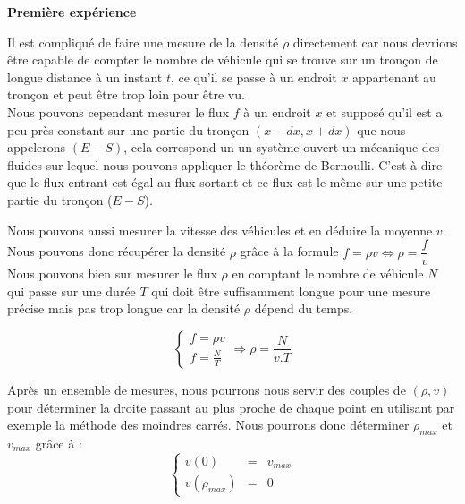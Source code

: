 \documentclass[12pt, openany]{report}
\begin{document}
\centering \textbf{\Large Première expérience}

\flushleft
Il est compliqué de faire une mesure de la densité $\rho$ directement car nous devrions être capable de compter le nombre de véhicule qui se trouve sur un tronçon de longue distance à un instant $t$, ce qu'il se passe à un endroit $x$ appartenant au tronçon et peut être trop loin pour être vu.\\
Nous pouvons cependant mesurer le flux $f$ à un endroit $x$ et supposé qu'il est a peu près constant sur une partie du tronçon $(x-dx,x+dx)$ que nous appelerons $(E-S)$, cela correspond un un système ouvert un mécanique des fluides sur lequel nous pouvons appliquer le théorème de Bernoulli. C'est à dire que le flux entrant est égal au flux sortant et ce flux est le même sur une petite partie du tronçon ($E-S$).\\

\centering{}
\flushleft

Nous pouvons aussi mesurer la vitesse des véhicules et en déduire la moyenne $v$.\\
Nous pouvons donc récupérer la densité $\rho$ grâce à la formule $f=\rho v \Leftrightarrow \rho =\dfrac{f}{v}$\normalsize\\
Nous pouvons bien sur mesurer le flux $\rho$ en comptant le nombre de véhicule $N$ qui passe sur une durée $T$ qui doit être suffisamment longue pour une mesure précise mais pas trop longue car la densité $\rho$ dépend du temps.

$$ 
\left\{
    \begin{array}{l}
        f=\rho v \\
        f=\frac{N}{T}
    \end{array}
\right. \Rightarrow
\rho = \frac{N}{v.T}
$$

Après un ensemble de mesures, nous pourrons nous servir des couples de $(\rho , v)$ pour déterminer la droite passant au plus proche de chaque point en utilisant par exemple la méthode des moindres carrés.
Nous pourrons donc déterminer $\rho_{max}$ et $v_{max}$ grâce à :
$$ 
\left\{
    \begin{array}{lll}
        v(0)&=&v_{max}\\
        v(\rho_{max})&=&0
    \end{array}
\right.
$$
\end{document}
